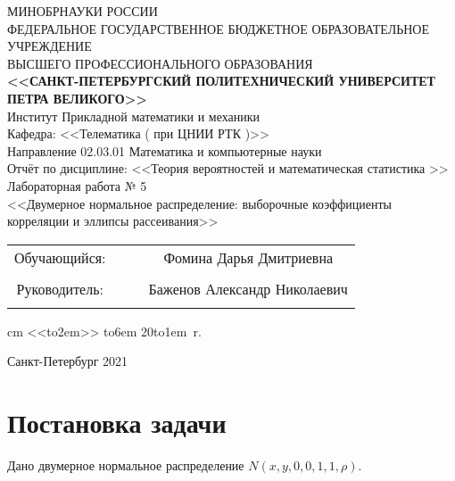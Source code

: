 \documentclass[12pt]{article}
\begin{document}
\begin{center}
\hfill \break
\large{МИНОБРНАУКИ РОССИИ} \\
\hfill \break
\small {ФЕДЕРАЛЬНОЕ ГОСУДАРСТВЕННОЕ БЮДЖЕТНОЕ ОБРАЗОВАТЕЛЬНОЕ УЧРЕЖДЕНИЕ }\\
\small { ВЫСШЕГО ПРОФЕССИОНАЛЬНОГО ОБРАЗОВАНИЯ  } \\
\hfill \break
\normalsize {\textbf{ <<САНКТ-ПЕТЕРБУРГСКИЙ ПОЛИТЕХНИЧЕСКИЙ УНИВЕРСИТЕТ } }\\
{\normalsize {\textbf { ПЕТРА ВЕЛИКОГО>>}}} \\
\hfill \break
\large{Институт Прикладной математики и механики }\\
\hfill \break
\large{ Кафедра: <<Телематика ( при ЦНИИ РТК )>> }\\
\hfill \break
Направление 02.03.01 Математика и компьютерные науки\\
\vskip 1cm
\Large {Отчёт по дисциплине:}
\vskip 0.2cm
\Large{<<Теория вероятностей и математическая статистика >>} \\
\hfill \break
\large{Лабораторная работа № 5} \\
\hfill \break
\large{<<Двумерное нормальное распределение: выборочные коэффициенты корреляции и эллипсы рассеивания>>} \\
\hfill \break
\vskip 0.3cm
\vskip 0.5cm
\end{center}


\begin {tabular}{cccc}
\hspace{0.5cm}Обучающийся: &\underline {\hspace{3cm}} &  &Фомина Дарья Дмитриевна \\\\
\hspace{0.5cm}Руководитель: &\underline {\hspace{3cm}} & &Баженов Александр Николаевич\\\\
\end{tabular}
 cm
\hspace{9cm}\def \hrf#1{\hbox to#1{\hrulefill}}<<\hrf{2em}>>  \hrf{6em}  20\hrf{1em}~r.
\vskip 1.5cm
\begin {center} Санкт-Петербург 2021 \end{center}

\thispagestyle{empty}

\newpage


\tableofcontents


\newpage
\section{Постановка задачи}
 Дано двумерное нормальное распределение $N(x, y, 0, 0, 1, 1, \rho)$.
\end{document}
